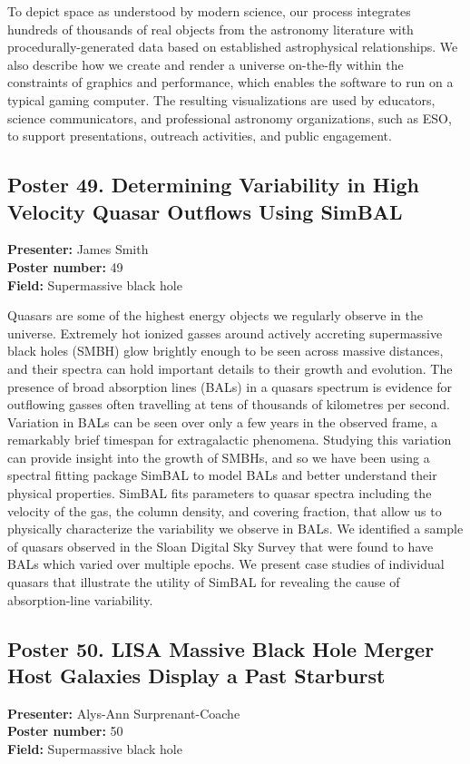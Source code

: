 To depict space as understood by modern science, our process integrates hundreds of thousands of real objects from the astronomy literature with procedurally-generated data based on established astrophysical relationships. We also describe how we create and render a universe on-the-fly within the constraints of graphics and performance, which enables the software to run on a typical gaming computer. The resulting visualizations are used by educators, science communicators, and professional astronomy organizations, such as ESO, to support presentations, outreach activities, and public engagement.

\hypertarget{poster-abstract-talk-188}{}\label{poster-abstract-page-talk-188}
\subsection*{Poster 49. Determining Variability in High Velocity Quasar Outflows Using SimBAL}
\textbf{Presenter:} James Smith\\
\textbf{Poster number:} 49\\
\textbf{Field:} Supermassive black hole

Quasars are some of the highest energy objects we regularly observe in the universe. Extremely hot ionized gasses around actively accreting supermassive black holes (SMBH) glow brightly enough to be seen across massive distances, and their spectra can hold important details to their growth and evolution. The presence of broad absorption lines (BALs) in a quasars spectrum is evidence for outflowing gasses often travelling at tens of thousands of kilometres per second. Variation in BALs can be seen over only a few years in the observed frame, a remarkably brief timespan for extragalactic phenomena. Studying this variation can provide insight into the growth of SMBHs, and so we have been using a spectral fitting package SimBAL to model BALs and better understand their physical properties. SimBAL fits parameters to quasar spectra including the velocity of the gas, the column density, and covering fraction, that allow us to physically characterize the variability we observe in BALs. We identified a sample of quasars observed in the Sloan Digital Sky Survey that were found to have BALs which varied over multiple epochs. We present case studies of individual quasars that illustrate the utility of SimBAL for revealing the cause of absorption-line variability.

\hypertarget{poster-abstract-talk-183}{}\label{poster-abstract-page-talk-183}
\subsection*{Poster 50. LISA Massive Black Hole Merger Host Galaxies Display a Past Starburst}
\textbf{Presenter:} Alys-Ann Surprenant-Coache\\
\textbf{Poster number:} 50\\
\textbf{Field:} Supermassive black hole

